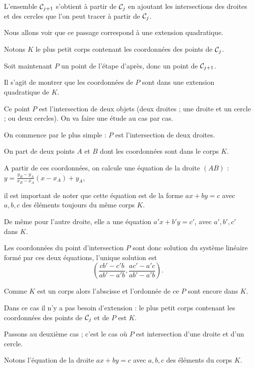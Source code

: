 \change
L'ensemble $\mathcal{C}_{j+1}$ s'obtient 
à partir de $\mathcal{C}_j$ en ajoutant les intersections des droites et des cercles
que l'on peut tracer à partir de $\mathcal{C}_j$.


Nous allons voir que ce passage correspond à une extension quadratique.

\change
Notons $K$ le plus petit corps contenant les coordonnées des points de $\mathcal{C}_j$.

\change
Soit maintenant $P$ un point de l'étape d'après, donc un point de $\mathcal{C}_{j+1}$.

Il s'agit de montrer que les coordonnées de $P$ sont dans une extension quadratique de $K$.

Ce point $P$ est l'intersection de deux objets (deux droites ; une droite et un cercle ;
ou deux cercles). On va faire une étude au cas par cas.

\change
On commence par le plus simple : $P$ est l'intersection de deux droites.

\change
On part de deux points $A$ et $B$ dont les coordonnées sont dans le corps $K$.

\change
A partir de ces coordonnées, on calcule une équation de la droite $(AB)$ :
$y = \frac{y_B-y_A}{x_B-x_A} (x-x_A)+ y_A$,

\change
il est important de noter que cette équation est de la forme $ax+by=c$ 
 avec $a,b,c$ des éléments toujours du même corps $K$.
 
\change
De même pour l'autre droite, elle a une équation $a'x+b'y=c'$, avec  $a',b',c'$ dans $K$.

\change 
Les coordonnées du point d'intersection $P$ sont donc solution du système linéaire formé par ces deux équations, l'unique solution est
$$\left(\frac{cb'-c'b}{ab'-a'b} , \frac{ac'-a'c}{ab'-a'b} \right).$$

\change
Comme $K$ est un corps alors l'abscisse et l'ordonnée de ce $P$ sont encore dans $K$.

\change
Dans ce cas il n'y a pas besoin d'extension : 
le plus petit corps contenant les coordonnées des points de $\mathcal{C}_j$ et de $P$ est $K$.


\diapo

Passons au deuxième cas ; c'est le cas où $P$ est intersection d'une droite et d'un cercle.


\change
Notons l'équation de la droite $ax+by=c$ avec $a,b,c$ des éléments du corps $K$.

